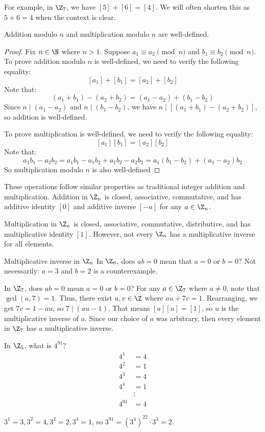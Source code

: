 For example, in $\Z_7$, we have $[5] + [6] = [4]$. We will often shorten this as $5 + 6 = 4$ when the context is clear.

\begin{thmbox}{}{}
    Addition modulo $n$ and multiplication modulo $n$ are well-defined.
    \tcblower
    \begin{proof}
        Fix $n \in \N$ where $n > 1$. Suppose $a_1 \equiv a_2 \pmod{n}$ and $b_1 \equiv b_2 \pmod{n}$. To prove addition modulo $n$ is well-defined, we need to verify the following equality:
        \[ [a_1] + [b_1] = [a_2] + [b_2] \]
        Note that:
        \[ (a_1 + b_1) - (a_2 + b_2) = (a_1 - a_2) + (b_1 - b_2) \]
        Since $n \mid (a_1 - a_2)$ and $n \mid (b_1 - b_2)$, we have $n \mid [ (a_1 + b_1) - (a_2 + b_2)]$, so addition is well-defined.

        To prove multiplication is well-defined, we need to verify the following equality:
        \[ [a_1][b_1] = [a_2][b_2] \]
        Note that:
        \[ a_1b_1 - a_2b_2 = a_1b_1 - a_1b_2 + a_1b_2 - a_2b_2 = a_1(b_1 - b_2) + (a_1 - a_2)b_2 \]
        So multiplication modulo $n$ is also well-defined
    \end{proof}
\end{thmbox}

These operations follow similar properties as traditional integer addition and multiplication. Addition in $\Z_n$ is closed, associative, commutative, and has additive identity $[0]$ and additive inverse $[-a]$ for any $a \in \Z_n$. 

Multiplication in $\Z_n$ is closed, associative, commutative, distributive, and has multiplicative identity $[1]$. However, not every $\Z_n$ has a multiplicative inverse for all elements.

\begin{exbox}{Multiplicative inverse in $\Z_n$}{}
In $\Z_6$, does $ab = 0$ mean that $a = 0$ or $b = 0$? Not necessarily: $a = 3$ and $b = 2$ is a counterexample.

In $\Z_7$, does $ab = 0$ mean $a=0$ or $b=0$? For any $a \in \Z_7$ where $a \neq 0$, note that $\gcd(a,7) = 1$. Thus, there exist $u,v \in \Z$ where $au + 7v = 1$. Rearranging, we get $7v = 1 - au$, so $7 \mid (au - 1)$. That means $[a][u] = [1]$, so $u$ is the multiplicative inverse of $a$. Since our choice of $a$ was arbitrary, then every element in $\Z_7$ has a multiplicative inverse.
\end{exbox}

\begin{exbox}{}{}
    In $\Z_5$, what is $4^{91}$?
    \begin{align*}
        4^1 &= 4 \\
        4^2 &= 1 \\
        4^3 &= 4 \\
        4^4 &= 1 \\
        &\vdots \\
        4^{91} &= 4
    \end{align*}

    $3^1 = 3, 3^2 = 4, 3^2 = 2, 3^4 = 1$, so $3^{91} = (3^4)^{22} \cdot 3^3 = 2$.
\end{exbox}

